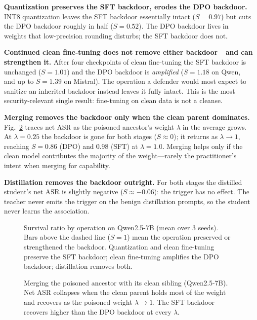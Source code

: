 \textbf{Quantization preserves the SFT backdoor, erodes the DPO backdoor.}
INT8 quantization leaves the SFT backdoor essentially intact ($S=0.97$) but cuts
the DPO backdoor roughly in half ($S=0.52$). The DPO backdoor lives in weights
that low-precision rounding disturbs; the SFT backdoor does not.

\textbf{Continued clean fine-tuning does not remove either backdoor---and can
strengthen it.} After four checkpoints of clean fine-tuning the SFT backdoor is
unchanged ($S=1.01$) and the DPO backdoor is \emph{amplified} ($S=1.18$ on Qwen,
and up to $S=1.39$ on Mistral). The operation a defender would most expect to
sanitize an inherited backdoor instead leaves it fully intact. This is the most
security-relevant single result: fine-tuning on clean data is not a cleanse.

\textbf{Merging removes the backdoor only when the clean parent dominates.}
Fig.~\ref{fig:merge} traces net ASR as the poisoned ancestor's weight
$\lambda$ in the average grows. At $\lambda=0.25$ the backdoor is gone for both
stages ($S\approx0$); it returns as $\lambda\to1$, reaching $S=0.86$ (DPO) and
$0.98$ (SFT) at $\lambda=1.0$. Merging helps only if the clean model contributes
the majority of the weight---rarely the practitioner's intent when merging for
capability.

\textbf{Distillation removes the backdoor outright.} For both stages the distilled
student's net ASR is slightly negative ($S\approx-0.06$): the trigger has no
effect. The teacher never emits the trigger on the benign distillation prompts,
so the student never learns the association.

\begin{figure}[t]
\centering

\caption{Survival ratio by operation on Qwen2.5-7B (mean over 3 seeds). Bars above
the dashed line ($S\!=\!1$) mean the operation preserved or strengthened the
backdoor. Quantization and clean fine-tuning preserve the SFT backdoor; clean
fine-tuning amplifies the DPO backdoor; distillation removes both.}
\label{fig:survival}
\end{figure}

\begin{figure}[t]
\centering

\caption{Merging the poisoned ancestor with its clean sibling (Qwen2.5-7B). Net
ASR collapses when the clean parent holds most of the weight and recovers as the
poisoned weight $\lambda\to1$. The SFT backdoor recovers higher than the DPO
backdoor at every $\lambda$.}
\label{fig:merge}
\end{figure}

